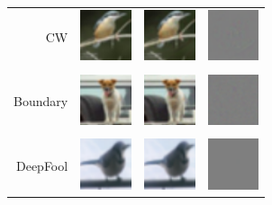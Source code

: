 \documentclass{article}
\begin{document}
\begin{table}[h]
	\centering
	\begin{tabular}{rlll} 
	CW & \includegraphics[height=1.5cm, align=c]{figures/carlini_wagner_orig.pdf} & \includegraphics[height=1.5cm, align=c]{figures/carlini_wagner_adversarial.pdf} & \includegraphics[height=1.5cm, align=c]{figures/carlini_wagner_diff.pdf}\\
	\\
	Boundary & \includegraphics[height=1.5cm, align=c]{figures/boundary_orig.pdf} & \includegraphics[height=1.5cm, align=c]{figures/boundary_adversarial.pdf} & \includegraphics[height=1.5cm, align=c]{figures/boundary_diff.pdf}\\
	\\
	DeepFool & \includegraphics[height=1.5cm, align=c]{figures/deepfool_orig.pdf} & \includegraphics[height=1.5cm, align=c]{figures/deepfool_adversarial.pdf} & \includegraphics[height=1.5cm, align=c]{figures/deepfool_diff.pdf}\\

\end{tabular}
\end{table}
\end{document}
